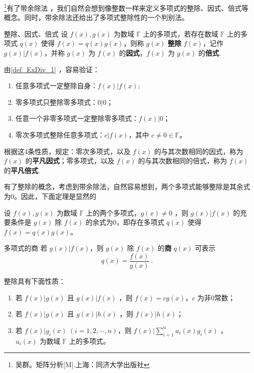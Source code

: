 

\footnote{吴群。矩阵分析[M].上海：同济大学出版社}有了带余除法 ，我们自然会想到像整数一样来定义多项式的整除、因式、倍式等概念。同时，带余除法还给出了多项式整除性的一个判别法。
\begin{definition}{整除、因式、倍式}\label{def_ExDiv_1}
设 $f(x),g(x)$ 为数域 $\mathbb{F}$ 上的多项式，若存在数域 $\mathbb{F}$ 上的多项式 $q(x)$ 使得 $f(x)=q(x)g(x)$，则称 $g(x)$ \textbf{整除} $f(x)$，记作 $g(x)|f(x)$，并称 $g(x)$ 为 $f(x)$ 的\textbf{因式}，$f(x)$ 为 $g(x)$ 的\textbf{倍式}.
\end{definition}
由\autoref{def_ExDiv_1} ，容易验证：
\begin{enumerate}
\item 任意多项式一定整除自身：$f(x)|f(x)$;
\item 零多项式只整除零多项式：$0|0$；
\item 任意一个非零多项式一定整除零多项式：$f(x)|0$；
\item 零次多项式整除任意多项式：$c|f(x)$，其中 $c\neq0\in\mathbb{F}$。
\end{enumerate}
根据这4条性质，规定：零次多项式，以及 $f(x)$ 的与其次数相同的因式，称为 $f(x)$ 的\textbf{平凡因式}；零多项式，以及 $f(x)$ 的与其次数相同的倍式，称为 $f(x)$ 的\textbf{平凡倍式}.

有了整除的概念，考虑到带余除法，自然容易想到，两个多项式能够整除是其余式为0。因此，下面定理是显然的
\begin{theorem}{}
设 $f(x),g(x)$ 为数域 $\mathbb{F}$ 上的两个多项式，$g(x)\neq 0$ ，则 $g(x)|f(x)$ 的充要条件是 $g(x)$ 除 $f(x)$ 的余式为0，即存在多项式 $q(x)$ 使得 $f(x)=q(x)g(x)$。
\end{theorem}
\begin{definition}{多项式的商}
若 $g(x)|f(x)$，则 $g(x)$ 除 $f(x)$ 的\textbf{商} $q(x)$ 可表示 
\begin{equation}
q(x)=\frac{f(x)}{g(x)}~.
\end{equation}

\end{definition}

整除具有下面性质：
\begin{enumerate}
\item 若 $f(x)|g(x)$ 且 $g(x)|f(x)$ ，则 $f(x)=cg(x)$，$c$ 为非0常数；
\item 若 $f(x)|g(x)$ 且 $g(x)|h(x)$ ，则 $f(x)|h(x)$；
\item 若 $f(x)|g_i(x)\;(i=1,2,\cdots,n)$，则 $f(x)|\sum\limits_{i=1}^{n}u_i(x)g_i(x)$ ， $u_i(x)$ 为数域 $\mathbb{F}$ 上的多项式。
\end{enumerate}

